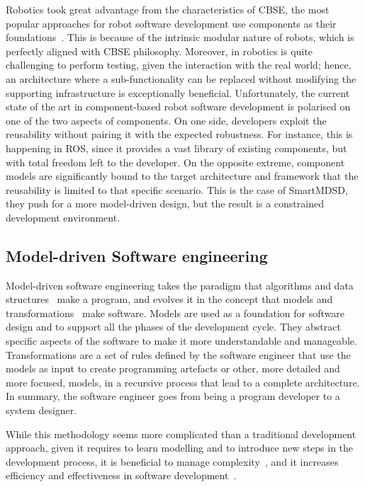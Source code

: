 Robotics took great advantage from the characteristics of CBSE, the most popular approaches for robot software development use components as their foundations~\cite{brugali2009component, brugali2010component}. This is because of the intrinsic modular nature of robots, which is perfectly aligned with CBSE philosophy. Moreover, in robotics is quite challenging to perform testing, given the interaction with the real world; hence, an architecture where a sub-functionality can be replaced without modifying the supporting infrastructure is exceptionally beneficial. Unfortunately, the current state of the art in component-based robot software development is polarised on one of the two aspects of components. On one side, developers exploit the reusability without pairing it with the expected robustness. For instance, this is happening in ROS, since it provides a vast library of existing components, but with total freedom left to the developer. On the opposite extreme, component models are significantly bound to the target architecture and framework that the reusability is limited to that specific scenario. This is the case of SmartMDSD, they push for a more model-driven design, but the result is a constrained development environment. 

\subsection{Model-driven Software engineering}
Model-driven software engineering takes the paradigm that algorithms and data structures~\cite{wirth1986algorithms} make a program, and evolves it in the concept that models and transformations~\cite{brambilla2012model} make software. Models are used as a foundation for software design and to support all the phases of the development cycle. They abstract specific aspects of the software to make it more understandable and manageable. Transformations are a set of rules defined by the software engineer that use the models as input to create programming artefacts or other, more detailed and more focused, models, in a recursive process that lead to a complete architecture. In summary, the software engineer goes from being a program developer to a system designer.

While this methodology seems more complicated than a traditional development approach, given it requires to learn modelling and to introduce new steps in the development process, it is beneficial to manage complexity~\cite{selic2003pragmatics}, and it increases efficiency and effectiveness in software development~\cite{acerbis2007developing}.

